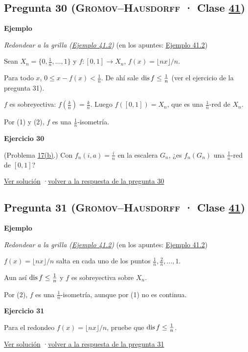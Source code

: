 \documentclass[11pt,a4paper]{article}
\providecommand{\lt}{<}\providecommand{\gt}{>}
\newcommand{\bloque}[1]{\par\smallskip\noindent\textbf{\color{acento}#1}\par}
\begin{document}
\subsection*{\hypertarget{e-30}{}Pregunta 30 \normalfont\small(\textsc{Gromov–Hausdorff} · Clase \href{https://decostruttivismo.github.io/MAT2514-repaso/pdf/MAT2514_apuntes_completos.pdf\#nameddest=section.41}{41})}
\bloque{Ejemplo}
\textit{Redondear a la grilla (\href{https://decostruttivismo.github.io/MAT2514-repaso/pdf/MAT2514_apuntes_completos.pdf\#nameddest=teorema.41.2}{Ejemplo 41.2})} {\small(en los apuntes: \href{https://decostruttivismo.github.io/MAT2514-repaso/pdf/MAT2514_apuntes_completos.pdf\#nameddest=teorema.41.2}{Ejemplo 41.2})}
\begin{pasos}
\item[] Sean $X_n=\{0,\frac1n,\dots,1\}$ y $f\colon[0,1]\to X_n$, $f(x)=\lfloor nx\rfloor/n$.
\item[(1)] Para todo $x$, $0\le x-f(x)\lt \frac1n$. De ahí sale $\operatorname{dis} f\le\frac1n$ (ver el ejercicio de la pregunta 31).
\item[(2)] $f$ es sobreyectiva: $f(\frac kn)=\frac kn$. Luego $f([0,1])=X_n$, que es una $\frac1n$-red de $X_n$.
\item[] Por (1) y (2), $f$ es una $\frac1n$-isometría.
\end{pasos}
\bloque{\hypertarget{x-30}{}Ejercicio 30}
(Problema \hyperlink{prob-17}{17(b)}.) Con $f_n(i,a)=\frac in$ en la escalera $G_n$, ¿es $f_n(G_n)$ una $\frac1n$-red de $[0,1]$?
\par{\small \hyperlink{s-30}{Ver solución} \quad·\quad \hyperlink{r-30}{volver a la respuesta de la pregunta 30}}
\subsection*{\hypertarget{e-31}{}Pregunta 31 \normalfont\small(\textsc{Gromov–Hausdorff} · Clase \href{https://decostruttivismo.github.io/MAT2514-repaso/pdf/MAT2514_apuntes_completos.pdf\#nameddest=section.41}{41})}
\bloque{Ejemplo}
\textit{Redondear a la grilla (\href{https://decostruttivismo.github.io/MAT2514-repaso/pdf/MAT2514_apuntes_completos.pdf\#nameddest=teorema.41.2}{Ejemplo 41.2})} {\small(en los apuntes: \href{https://decostruttivismo.github.io/MAT2514-repaso/pdf/MAT2514_apuntes_completos.pdf\#nameddest=teorema.41.2}{Ejemplo 41.2})}
\begin{pasos}
\item[(1)] $f(x)=\lfloor nx\rfloor/n$ salta en cada uno de los puntos $\frac1n,\frac2n,\dots,1$.
\item[(2)] Aun así $\operatorname{dis} f\le\frac1n$ y $f$ es sobreyectiva sobre $X_n$.
\item[] Por (2), $f$ es una $\frac1n$-isometría, aunque por (1) no es continua.
\end{pasos}
\bloque{\hypertarget{x-31}{}Ejercicio 31}
Para el redondeo $f(x)=\lfloor nx\rfloor/n$, pruebe que $\operatorname{dis} f\le\frac1n$.
\par{\small \hyperlink{s-31}{Ver solución} \quad·\quad \hyperlink{r-31}{volver a la respuesta de la pregunta 31}}
\end{document}
